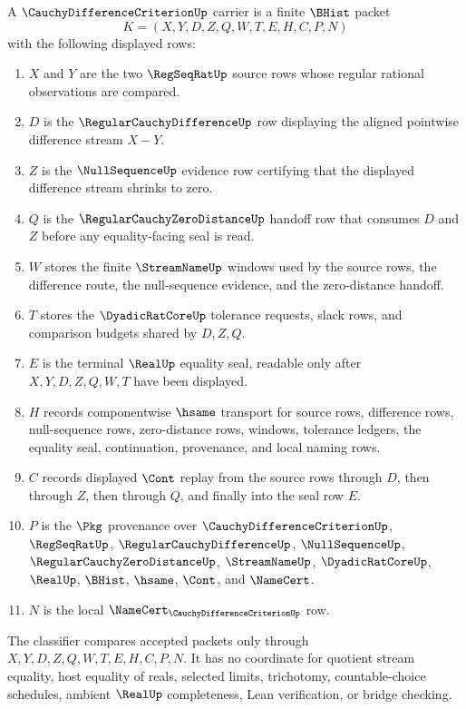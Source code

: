 \begin{definition}
\label{def:cauchy-difference-criterion-carrier}
A $\CauchyDifferenceCriterionUp$ carrier is a finite $\BHist$ packet
$$
K=(X,Y,D,Z,Q,W,T,E,H,C,P,N)
$$
with the following displayed rows:
\begin{enumerate}
\item $X$ and $Y$ are the two $\RegSeqRatUp$ source rows whose regular rational observations are compared.
\item $D$ is the $\RegularCauchyDifferenceUp$ row displaying the aligned pointwise difference stream $X-Y$.
\item $Z$ is the $\NullSequenceUp$ evidence row certifying that the displayed difference stream shrinks to zero.
\item $Q$ is the $\RegularCauchyZeroDistanceUp$ handoff row that consumes $D$ and $Z$ before any equality-facing seal is read.
\item $W$ stores the finite $\StreamNameUp$ windows used by the source rows, the difference route, the null-sequence evidence, and the zero-distance handoff.
\item $T$ stores the $\DyadicRatCoreUp$ tolerance requests, slack rows, and comparison budgets shared by $D,Z,Q$.
\item $E$ is the terminal $\RealUp$ equality seal, readable only after $X,Y,D,Z,Q,W,T$ have been displayed.
\item $H$ records componentwise $\hsame$ transport for source rows, difference rows, null-sequence rows, zero-distance rows, windows, tolerance ledgers, the equality seal, continuation, provenance, and local naming rows.
\item $C$ records displayed $\Cont$ replay from the source rows through $D$, then through $Z$, then through $Q$, and finally into the seal row $E$.
\item $P$ is the $\Pkg$ provenance over $\CauchyDifferenceCriterionUp$, $\RegSeqRatUp$, $\RegularCauchyDifferenceUp$, $\NullSequenceUp$, $\RegularCauchyZeroDistanceUp$, $\StreamNameUp$, $\DyadicRatCoreUp$, $\RealUp$, $\BHist$, $\hsame$, $\Cont$, and $\NameCert$.
\item $N$ is the local $\NameCert_{\CauchyDifferenceCriterionUp}$ row.
\end{enumerate}
The classifier compares accepted packets only through $X,Y,D,Z,Q,W,T,E,H,C,P,N$. It has no coordinate for quotient stream equality, host equality of reals, selected limits, trichotomy, countable-choice schedules, ambient $\RealUp$ completeness, Lean verification, or bridge checking.
\end{definition}

